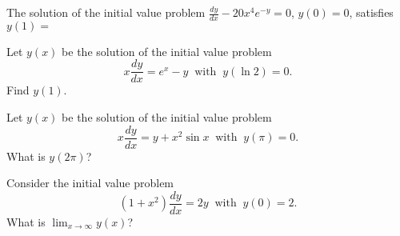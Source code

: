\documentclass{ximera}
\begin{document}
\begin{question}%

The solution of the initial value problem \(\displaystyle \frac{dy}{dx} - 20 x^4 e^{-y} = 0\),  \(y(0) = 0\),
satisfies \(y(1) = \)
\begin{multiplechoice}
\end{multiplechoice}

\end{question}

\begin{question}%

Let \(y(x)\) be the solution of the initial value problem
\[ x \frac{dy}{dx} = e^x - y \ \text{ with } \ y(\ln 2) = 0. \]
Find \(y(1)\).
\begin{multiplechoice}
\end{multiplechoice}

\end{question}

\begin{question}%

Let \(y(x)\) be the solution of the initial value problem
\[ x \frac{dy}{dx} = y + x^2 \sin x \ \text{ with } \ y (\pi) = 0. \]
What is \(y(2 \pi)\)?
\begin{multiplechoice}
\choice{\(-\pi\)}
\choice{\(-2\pi\)}
\choice[correct]{\(-4\pi\)}
\choice{\(2\pi\)}
\choice{\(4\pi\)}
\end{multiplechoice}

\end{question}

\begin{question}%

Consider the initial value problem
\[ (1 + x^2) \frac{dy}{dx} = 2y \ \text{ with } \ y(0) = 2. \]
What is \(\displaystyle \lim_{x \rightarrow \infty} y(x)\)?
\begin{multiplechoice}
\end{multiplechoice}

\end{question}
\end{document}
